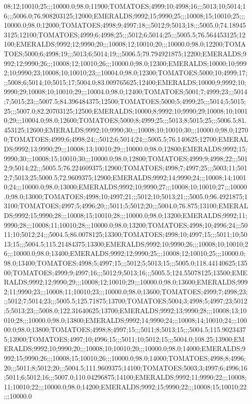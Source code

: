 08;12;10010;25;;;10000.0;98.0;11900;TOMATOES;4999;10;4998;16;;;5013;10;5014;16;;;5006.0;76.908203125;12000;EMERALDS;9992;15;9990;25;;;10008;15;10010;25;;;10000.0;98.0;12000;TOMATOES;4998;9;4997;18;;;5012;9;5013;18;;;5005.0;74.189453125;12100;TOMATOES;4999;6;4998;25;;;5012;6;5014;25;;;5005.5;76.564453125;12100;EMERALDS;9992;12;9990;20;;;10008;12;10010;20;;;10000.0;98.0;12200;TOMATOES;5000;6;4998;19;;;5013;6;5014;19;;;5006.5;79.794921875;12200;EMERALDS;9992;12;9990;26;;;10008;12;10010;26;;;10000.0;98.0;12300;EMERALDS;10000;10;9992;10;9990;23;10008;10;10010;23;;;10004.0;98.0;12300;TOMATOES;5000;10;4999;17;;;5008;6;5014;10;5015;17;5004.0;83.009765625;12400;EMERALDS;10000;9;9992;10;9990;29;10008;10;10010;29;;;10004.0;98.0;12400;TOMATOES;5001;7;4999;23;;;5014;7;5015;23;;;5007.5;84.396484375;12500;TOMATOES;5000;5;4999;25;;;5014;5;5015;25;;;5007.0;82.20703125;12500;EMERALDS;10000;8;9992;10;9990;29;10008;10;10010;29;;;10004.0;98.0;12600;TOMATOES;5000;8;4999;25;;;5013;8;5015;25;;;5006.5;81.453125;12600;EMERALDS;9992;10;9990;30;;;10008;10;10010;30;;;10000.0;98.0;12700;TOMATOES;4999;6;4998;24;;;5012;6;5014;24;;;5005.5;76.140625;12700;EMERALDS;9992;13;9990;29;;;10008;13;10010;29;;;10000.0;98.0;12800;EMERALDS;9992;15;9990;30;;;10008;15;10010;30;;;10000.0;98.0;12800;TOMATOES;4999;9;4998;22;;;5012;9;5014;22;;;5005.5;76.224609375;12900;TOMATOES;4998;7;4997;25;;;5003;11;5012;7;5013;25;5000.5;72.9609375;12900;EMERALDS;9992;14;9990;24;;;10008;14;10010;24;;;10000.0;98.0;13000;EMERALDS;9992;10;9990;27;;;10008;10;10010;27;;;10000.0;98.0;13000;TOMATOES;4998;10;4997;21;;;5012;10;5013;21;;;5005.0;96.4921875;13100;TOMATOES;4997;5;4996;20;;;5011;5;5012;20;;;5004.0;76.875;13100;EMERALDS;9992;15;9990;28;;;10008;15;10010;28;;;10000.0;98.0;13200;EMERALDS;9992;11;9990;28;;;10008;11;10010;28;;;10000.0;98.0;13200;TOMATOES;4998;10;4996;24;;;5011;10;5012;24;;;5004.5;86.0078125;13300;TOMATOES;4998;10;4997;15;;;5011;10;5013;15;;;5004.5;115.21484375;13300;EMERALDS;9992;10;9990;26;;;10008;10;10010;26;;;10000.0;98.0;13400;EMERALDS;9992;12;9990;25;;;10008;12;10010;25;;;10000.0;98.0;13400;TOMATOES;4998;5;4997;15;;;5012;5;5013;15;;;5005.0;118.44140625;13500;TOMATOES;4999;9;4997;16;;;5012;9;5013;16;;;5005.5;124.55078125;13500;EMERALDS;9992;12;9990;29;;;10008;12;10010;29;;;10000.0;98.0;13600;EMERALDS;9992;11;9990;23;;;10008;11;10010;23;;;10000.0;98.0;13600;TOMATOES;4999;7;4998;23;;;5012;7;5014;23;;;5005.5;125.71875;13700;TOMATOES;5004;3;4998;5;4997;23;5012;5;5013;23;;;5008.0;122.31640625;13700;EMERALDS;9992;13;9990;28;;;10008;13;10010;28;;;10000.0;98.0;13800;EMERALDS;9992;14;9990;24;;;10008;14;10010;24;;;10000.0;98.0;13800;TOMATOES;4998;8;4997;15;;;5011;8;5013;15;;;5004.5;115.90234375;13900;TOMATOES;4997;10;4996;15;;;5011;10;5012;15;;;5004.0;108.25;13900;EMERALDS;9992;10;9990;20;;;10008;10;10010;20;;;10000.0;98.0;14000;EMERALDS;9992;15;9990;26;;;10008;15;10010;26;;;10000.0;98.0;14000;TOMATOES;4998;8;4996;20;;;5011;8;5012;20;;;5004.5;111.9609375;14100;TOMATOES;5003;3;4997;6;4996;16;5011;6;5012;16;;;5007.0;110.04296875;14100;EMERALDS;9992;11;9990;22;;;10008;11;10010;22;;;10000.0;98.0;14200;EMERALDS;9992;15;9990;22;;;10008;15;10010;22;;;10000.0
